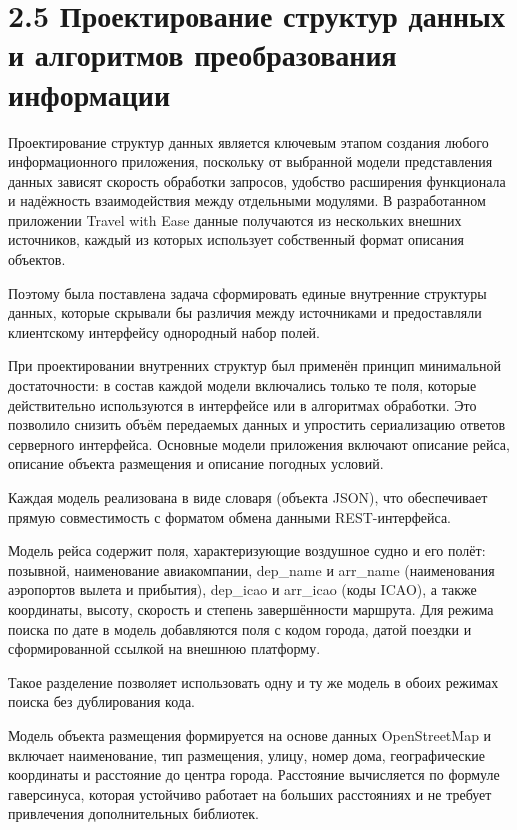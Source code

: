 \documentclass[14pt,a4paper,oneside]{extreport}
\begin{document}
\section*{2.5 Проектирование структур данных и алгоритмов преобразования информации}

Проектирование структур данных является ключевым этапом создания любого информационного приложения, поскольку от выбранной модели представления данных зависят скорость обработки запросов, удобство расширения функционала и надёжность взаимодействия между отдельными модулями. В разработанном приложении Travel with Ease данные получаются из нескольких внешних источников, каждый из которых использует собственный формат описания объектов.

Поэтому была поставлена задача сформировать единые внутренние структуры данных, которые скрывали бы различия между источниками и предоставляли клиентскому интерфейсу однородный набор полей.

При проектировании внутренних структур был применён принцип минимальной достаточности: в состав каждой модели включались только те поля, которые действительно используются в интерфейсе или в алгоритмах обработки. Это позволило снизить объём передаемых данных и упростить сериализацию ответов серверного интерфейса. Основные модели приложения включают описание рейса, описание объекта размещения и описание погодных условий.

Каждая модель реализована в виде словаря (объекта JSON), что обеспечивает прямую совместимость с форматом обмена данными REST-интерфейса.

Модель рейса содержит поля, характеризующие воздушное судно и его полёт: позывной, наименование авиакомпании, dep\_name и arr\_name (наименования аэропортов вылета и прибытия), dep\_icao и arr\_icao (коды ICAO), а также координаты, высоту, скорость и степень завершённости маршрута. Для режима поиска по дате в модель добавляются поля с кодом города, датой поездки и сформированной ссылкой на внешнюю платформу.

Такое разделение позволяет использовать одну и ту же модель в обоих режимах поиска без дублирования кода.

Модель объекта размещения формируется на основе данных OpenStreetMap и включает наименование, тип размещения, улицу, номер дома, географические координаты и расстояние до центра города. Расстояние вычисляется по формуле гаверсинуса, которая устойчиво работает на больших расстояниях и не требует привлечения дополнительных библиотек.
\end{document}
